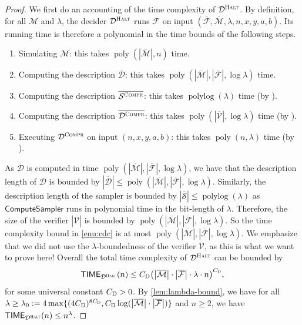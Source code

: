 \documentclass[11pt]{article}
\theoremstyle{definition}
\DeclareMathOperator{\poly}{poly}
\newcommand{\desc}[1]{\overline{\cal{#1}}}
\DeclareMathOperator{\polylog}{polylog}
\newcommand{\abs}[1]{\left\vert {#1} \right\vert}
\newcommand{\sampler}{\mathcal{S}}
\newcommand{\decider}{\mathcal{D}}
\newcommand{\verifier}{\mathcal{V}}
\newcommand{\labelstyle}[1]{\ensuremath{\textsc{#1}}\xspace}
\newcommand{\compr}{\textsc{Compr}}
\newcommand{\halt}{\textsc{Halt}}
\newcommand{\machine}{\cal{M}}
\renewcommand{\cal}[1]{\mathcal{#1}}
\newcommand{\TIME}{\mathsf{TIME}}
\newcommand{\tmstyle}[1]{\ensuremath{\mathsf{#1}}}
\newcommand{\ComputeSampler}{\tmstyle{ComputeSampler}}
\begin{document}
\begin{proof}

  We first do an accounting of the time complexity of $\decider^\halt$.
  By definition, for all $\cal{M}$ and $\lambda$, the decider $\decider^\halt$
  runs $\cal{F}$ on input $(\desc{F}, \desc{M}, \lambda, n, x, y, a, b)$.
  Its running time is therefore a polynomial in the time bounds of
  the following steps.

  \begin{enumerate}
  \item Simulating $\cal{M}$: this takes $\poly(\abs{\overline{\machine}}, n)$ time.
  \item \label{enu:d} Computing the description $\overline{\decider}$: this
    takes $\poly(\abs{\overline{\machine}}, \abs{\overline{\cal{F}}},\log \lambda)$ time.
  \item Computing the description $\overline{\sampler^\compr}$: this takes
    $\polylog(\lambda)$ time (by ). 
  \item \label{enu:cdc} Computing the description $\overline{\decider^\compr}$: this takes
    $\poly(\abs{\overline{\verifier}}, \log\lambda)$ time (by ). 
  \item \label{enu:rdc} Executing $\decider^\compr$ on input $(n,x,y,a,b)$: this
    takes $\poly(n, \lambda)$ time (by ).
  \end{enumerate}

  As $\overline{\decider}$ is computed in time $\poly(\abs{\overline{\machine}},
  \abs{\overline{\cal{F}}},\log \lambda)$, we have that the description length of $\decider$ is bounded by $\abs{\overline{\decider}} \le
  \poly(\abs{\overline{\cal{M}}}, \abs{\overline{\cal{F}}},\log \lambda)$.
  Similarly, the description length of the sampler is bounded by $\abs{\overline{\sampler}} \le \polylog(\lambda)$ as
  $\ComputeSampler$ runs in polynomial time in the bit-length of $\lambda$.
  Therefore, the size of the verifier $\abs{\overline{\verifier}}$ is bounded by
  $\poly(\abs{\overline{\cal{M}}}, \abs{\overline{\cal{F}}}, \log \lambda)$.
  So the time complexity bound in \cref{enu:cdc} is at most
  $\poly(\abs{\overline{\cal{M}}}, \abs{\overline{\cal{F}}}, \log \lambda)$. We emphasize that we did not use the $\lambda$-boundedness of the verifier
  $\verifier$, as this is what we want to prove here!
  Overall the total time complexity of $\decider^\halt$ can be bounded by
  \begin{equation}\label{eq:125-dec}
    \TIME_{\decider^\halt}(n) \le C_{\labelstyle{D}} \bigl( \abs{\overline{\cal{M}}}
    \cdot \abs{\overline{\cal{F}}} \cdot \lambda \cdot n \bigr)^{C_{\labelstyle{D}}},
  \end{equation}
  for some universal constant $C_{\labelstyle{D}} > 0$. 
  By \cref{lem:lambda-bound}, we have for all $\lambda \ge \lambda_{0} := 4 \max \{ (4C_{\labelstyle{D}})^{8C_{\labelstyle{D}}} , C_\labelstyle{D} \log (\abs{\overline{\cal{M}}} \cdot \abs{\overline{\cal{F}}}) \}$ and $n \ge 2$, we have $\TIME_{\decider^\halt}(n) \le n^\lambda$.


\end{proof}
\end{document}
